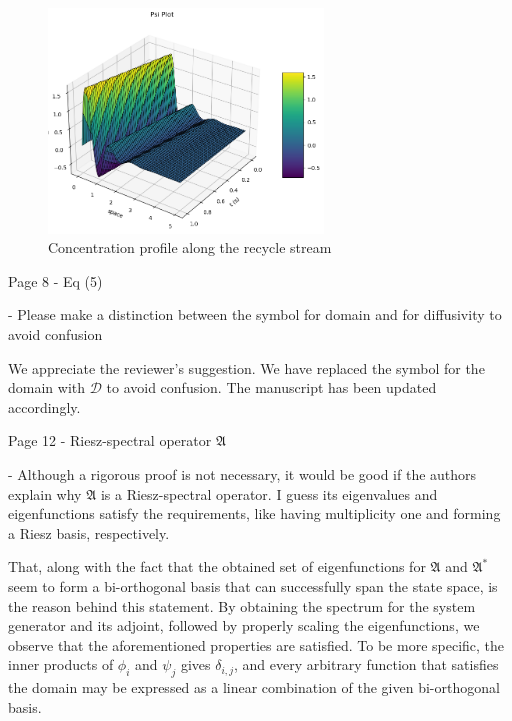 \documentclass[12pt,answers]{exam}
\begin{document}
\begin{questions}
\begin{figure}[H]
    \centering
    \includegraphics[width=0.65\textwidth]{x2_vs_z.png}
    \caption{Concentration profile along the recycle stream}
    \label{fig:x2}
\end{figure}

    \question Page 8 - Eq (5)
    
    - Please make a distinction between the symbol for domain and for diffusivity to avoid confusion

    \begin{solutionorbox} \label{comment:1_7'}
        We appreciate the reviewer's suggestion. We have replaced the symbol for the domain with $\mathcal{D}$ to avoid confusion. The manuscript has been updated accordingly.
    \end{solutionorbox}


    \question Page 12 - Riesz-spectral operator $\mathfrak{A}$

    - Although a rigorous proof is not necessary, it would be good if the authors explain why $\mathfrak{A}$ is a Riesz-spectral operator. I guess its eigenvalues and eigenfunctions satisfy the requirements, like having multiplicity one and forming a Riesz basis, respectively.

    \begin{solutionorbox} \label{comment:1_8}
        That, along with the fact that the obtained set of eigenfunctions for $\mathfrak{A}$ and $\mathfrak{A}^*$ seem to form a bi-orthogonal basis that can successfully span the state space, is the reason behind this statement. By obtaining the spectrum for the system generator and its adjoint, followed by properly scaling the eigenfunctions, we observe that the aforementioned properties are satisfied. To be more specific, the inner products of $\phi_i$ and $\psi_j$ gives $\delta_{i,j}$, and every arbitrary function that satisfies the domain may be expressed as a linear combination of the given bi-orthogonal basis.
    \end{solutionorbox}



\end{questions}
\end{document}
